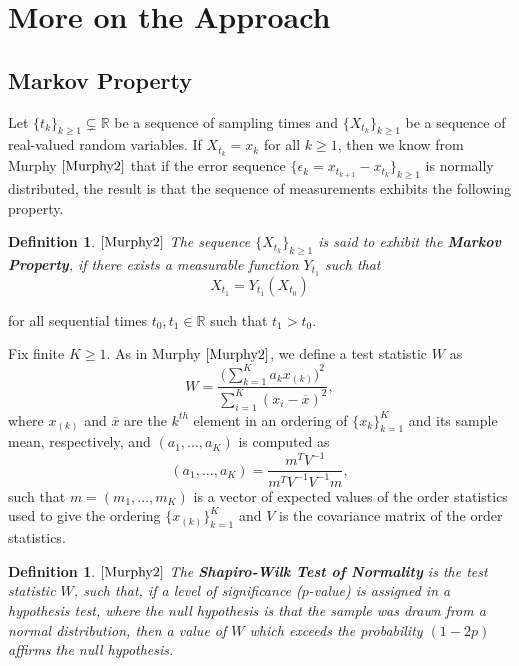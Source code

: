 \documentclass[11pt]{imsart}
\newtheorem{definition}[theorem]{Definition}
\begin{document}
\section{More on the Approach}

\subsection{Markov Property}
\label{prop}

Let $\{t_{k}\}_{k \ge 1} \subsetneq \mathbb{R}$ be a sequence of sampling times and $\{X_{t_{k}}\}_{k \ge 1}$ be a sequence of real-valued random variables.  If $X_{t_{k}}=x_{k}$ for all $k \ge 1$, then we know from Murphy $\cite{Murphy2}$ that if the error sequence $\{\epsilon_{k}=x_{t_{k+1}}-x_{t_{k}}\}_{k \ge 1}$ is normally distributed, the result is that the sequence of measurements exhibits the following property.

\begin{definition}
$\cite[Definition\ (1)]{Murphy2}$
The sequence $\{X_{t_{k}}\}_{k \ge 1}$ is said to exhibit the \textbf{Markov Property}, if there exists a measurable function $Y_{t_{1}}$ such that
\begin{equation}
\label{XY}
X_{t_{1}} = Y_{t_{1}}(X_{t_{0}})
\end{equation}
\end{definition}
for all sequential times $t_{0},t_{1} \in \mathbb{R}$ such that $t_{1} > t_{0}$.

Fix finite $K \ge 1$.  As in Murphy $\cite{Murphy2}$, we define a test statistic $W$ as
\begin{equation}
W = \frac{\bigg(\sum_{k=1}^{K}a_{k}x_{(k)}\bigg)^{2}}{\sum_{i=1}^{K}(x_{i}-\overline{x})^{2}},
\end{equation}
where $x_{(k)}$ and $\overline{x}$ are the $k^{th}$ element in an ordering of $\{x_{k}\}_{k = 1}^{K}$ and its sample mean, respectively, and $(a_{1},...,a_{K})$ is computed as
\begin{equation}
(a_{1},...,a_{K}) = \frac{m^{T}V^{-1}}{m^{T}V^{-1}V^{-1}m},
\end{equation}
such that $m = (m_{1},...,m_{K})$ is a vector of expected values of the order statistics used to give the ordering $\{x_{(k)}\}_{k=1}^{K}$ and $V$ is the covariance matrix of the order statistics.

\begin{definition}
\label{SW}
$\cite[Definition\ (8)]{Murphy2}$
The \textbf{Shapiro-Wilk Test of Normality} is the test statistic $W$, such that, if a level of significance ($p$-value) is assigned in a hypothesis test, where the null hypothesis is that the sample was drawn from a normal distribution, then a value of $W$ which exceeds the probability $(1-2p)$ affirms the null hypothesis.
\end{definition}
\end{document}
